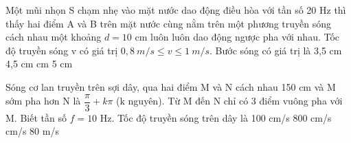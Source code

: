 \begin{ex}%
Một mũi nhọn S chạm nhẹ vào mặt nước dao động điều hòa với tần số 20 Hz thì thấy hai điểm A và B trên mặt nước cùng nằm trên một phương truyền sóng cách nhau một khoảng $d=10$ cm luôn luôn dao động ngược pha với nhau. Tốc độ truyền sóng v có giá trị $0,8\ m/s \leq v \leq 1\ m/s$. Bước sóng có giá trị là
\choice
{3,5 cm}
{4,5 cm}
{ cm}
{5 cm}
\end{ex} 
\begin{ex}%
Sóng cơ lan truyền trên sợi dây, qua hai điểm M và N cách nhau 150 cm và M sớm pha hơn N là $\dfrac{\pi}{3}+k\pi$ (k nguyên). Từ M đến N chỉ có 3 điểm vuông pha với M. Biết tần số $f = 10$ Hz. Tốc độ truyền sóng trên dây là
\choice
{100 cm/s}
{800 cm/s}
{ cm/s}
{80 m/s}
\end{ex} 


